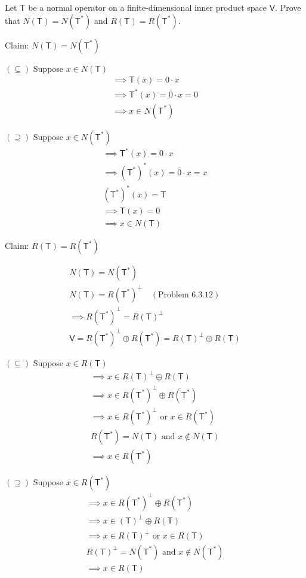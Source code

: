 Let $\mathsf{T}$ be a normal operator on a finite-dimensional inner
product space $\mathsf{V}.$ Prove that $N(\mathsf{T}) =
N(\mathsf{T}^*)$ and $R(\mathsf{T}) = R(\mathsf{T}^*).$

Claim:  $N(\mathsf{T}) = N(\mathsf{T}^*)$

$(\subseteq)$ Suppose $x \in N(\mathsf{T})$
\begin{gather}
\implies \mathsf{T}(x) = 0\cdot x\\
\implies \mathsf{T}^*(x) = \bar{0}\cdot x =0\\
\implies x \in N(\mathsf{T}^*)
\end{gather}

$(\supseteq)$ Suppose $x \in N(\mathsf{T}^*)$
\begin{gather}
\implies \mathsf{T}^*(x) = 0 \cdot x\\
\implies \left(\mathsf{T}^*\right)^*(x) = \bar{0}\cdot x = x\\
\left(\mathsf{T}^*\right)^*(x) = \mathsf{T}\\
\implies \mathsf{T}(x) = 0\\
\implies x \in N(\mathsf{T})
\end{gather}

Claim: $R(\mathsf{T}) = R(\mathsf{T}^*)$

\begin{gather}
N(\mathsf{T}) = N(\mathsf{T}^*)\\
N(\mathsf{T}) = R(\mathsf{T}^*)^\perp \quad (\text{Problem 6.3.12})\\
\implies R(\mathsf{T}^*)^\perp = R(\mathsf{T})^\perp\\
\mathsf{V} = R(\mathsf{T}^*)^\perp \oplus R(\mathsf{T}^*) =
R(\mathsf{T})^\perp \oplus R(\mathsf{T})
\end{gather}

$(\subseteq)$ Suppose $x \in R(\mathsf{T})$
\begin{gather}
\implies x \in R(\mathsf{T})^\perp \oplus R(\mathsf{T})\\
\implies x \in R(\mathsf{T}^*)^\perp \oplus R(\mathsf{T}^*)\\
\implies x \in R(\mathsf{T}^*)^\perp \text{ or } x \in
R(\mathsf{T}^*)\\
R(\mathsf{T}^*) = N(\mathsf{T}) \text{ and } x \notin N(\mathsf{T})\\
\implies x \in R(\mathsf{T}^*)
\end{gather}

$(\supseteq)$ Suppose $x \in R(\mathsf{T}^*)$
\begin{gather}
\implies x \in R(\mathsf{T}^*)^\perp \oplus R(\mathsf{T}^*)\\
\implies x \in (\mathsf{T})^\perp \oplus R(\mathsf{T})\\
\implies x \in R(\mathsf{T})^\perp \text{ or } x \in R(\mathsf{T})\\
R(\mathsf{T})^\perp = N(\mathsf{T}^*) \text{ and } x \notin
N(\mathsf{T}^*)\\
\implies x \in R(\mathsf{T})
\end{gather}

